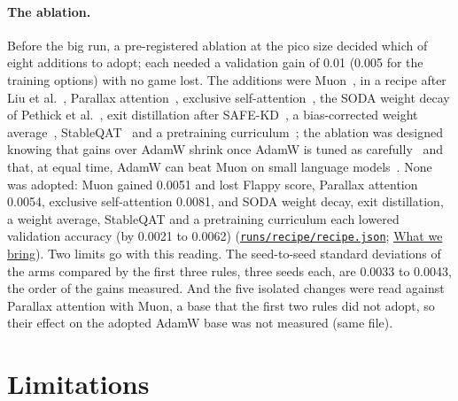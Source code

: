 \documentclass[10pt]{article}
\begin{document}
\paragraph{The ablation.} Before the big run, a pre-registered ablation at the pico size decided which of eight additions to adopt; each needed a validation gain of 0.01 (0.005 for the training options) with no game lost. The additions were Muon~\cite{jordan2024muon}, in a recipe after Liu et al.~\cite{liu2025muonscalable}, Parallax attention~\cite{zuo2026parallax}, exclusive self-attention~\cite{zhai2026xsa}, the SODA weight decay of Pethick et al.~\cite{pethick2026soda}, exit distillation after SAFE-KD~\cite{khazem2026safekd}, a bias-corrected weight average~\cite{block2025bema}, StableQAT~\cite{chen2026stableqat} and a pretraining curriculum~\cite{zhang2025curriculum}; the ablation was designed knowing that gains over AdamW shrink once AdamW is tuned as carefully~\cite{wen2025optimizers} and that, at equal time, AdamW can beat Muon on small language models~\cite{akhtar2026muon}. None was adopted: Muon gained 0.0051 and lost Flappy score, Parallax attention 0.0054, exclusive self-attention 0.0081, and SODA weight decay, exit distillation, a weight average, StableQAT and a pretraining curriculum each lowered validation accuracy (by 0.0021 to 0.0062) (\href{https://github.com/maxgfr/skycmd/blob/main/runs/recipe/recipe.json}{\texttt{runs/\allowbreak{}recipe/\allowbreak{}recipe.json}}; \href{https://maxgfr.github.io/skycmd/novelty/\#at-a-glance}{What we bring}). Two limits go with this reading. The seed-to-seed standard deviations of the arms compared by the first three rules, three seeds each, are 0.0033 to 0.0043, the order of the gains measured. And the five isolated changes were read against Parallax attention with Muon, a base that the first two rules did not adopt, so their effect on the adopted AdamW base was not measured (same file).

\section{Limitations}\label{sec:7}
\end{document}
